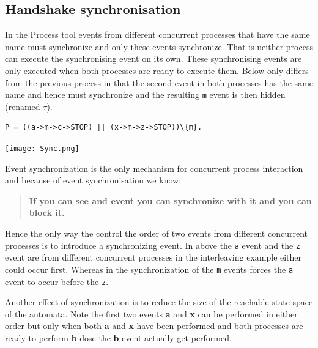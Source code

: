 \documentclass[]{article}
\begin{document}
\subsection{Handshake synchronisation }

   In the Process tool events from different concurrent processes that have the same name must synchronize and only these events synchronize. That is neither process can  execute the synchronising event on its own.  These  synchronising events are only executed when both processes are ready to execute them.
  Below only differs  from the previous process in that the second event in both processes has the same name and hence must  synchronize and the resulting \verb$m$ event is then hidden (renamed $\tau$).


 \begin{center}
\begin{minipage}{0.5\textwidth}
\begin{verbatim}
P = ((a->m->c->STOP) || (x->m->z->STOP))\{m}.
\end{verbatim}
\end{minipage}

\texttt{[image: Sync.png]}

\end{center}

\noindent Event synchronization is the only mechanism for concurrent process interaction and because of event synchronisation we know:

\begin{quote}
{\bf If you can see and event you can synchronize with it and you can block it.}
\end{quote}





 Hence the only way  the  control the order of two events from different concurrent   processes is to introduce a synchronizing event. In above the \verb$a$ event and the \verb$z$ event are from different concurrent processes in the interleaving example either could occur first. Whereas in the synchronization of the \verb$m$ events forces the \verb$a$ event to occur before the \verb$z$.

Another  effect of synchronization   is to reduce the size of the reachable state space of the automata. Note the first two events {\bf a} and {\bf x} can be performed in either order but only when both {\bf a} and {\bf x} have been performed and both processes are ready to perform {\bf b} dose the {\bf b}  event actually get performed.
\end{document}
